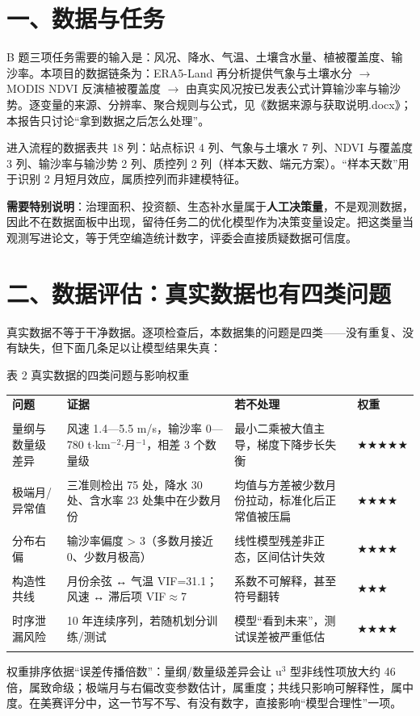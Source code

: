 \documentclass[11pt,a4paper]{ctexart}
\begin{document}
\section*{一、数据与任务}
B 题三项任务需要的输入是：风况、降水、气温、土壤含水量、植被覆盖度、输沙率。本项目的数据链条为：ERA5-Land 再分析提供气象与土壤水分 $\to$ MODIS NDVI 反演植被覆盖度 $\to$ 由真实风况按已发表公式计算输沙率与输沙势。逐变量的来源、分辨率、聚合规则与公式，见《数据来源与获取说明.docx》；本报告只讨论“拿到数据之后怎么处理”。

进入流程的数据表共 18 列：站点标识 4 列、气象与土壤水 7 列、NDVI 与覆盖度 3 列、输沙率与输沙势 2 列、质控列 2 列（样本天数、端元方案）。“样本天数”用于识别 2 月短月效应，属质控列而非建模特征。

\textbf{需要特别说明}：治理面积、投资额、生态补水量属于\textbf{人工决策量}，不是观测数据，因此不在数据面板中出现，留待任务二的优化模型作为决策变量设定。把这类量当观测写进论文，等于凭空编造统计数字，评委会直接质疑数据可信度。


\section*{二、数据评估：真实数据也有四类问题}
真实数据不等于干净数据。逐项检查后，本数据集的问题是四类——没有重复、没有缺失，但下面几条足以让模型结果失真：

表 2  真实数据的四类问题与影响权重


\begin{table}[H]\centering\small\setlength{\parskip}{2pt}
\begin{tabularx}{\textwidth}{|X|X|X|X|}
\toprule
\textbf{问题} & \textbf{证据} & \textbf{若不处理} & \textbf{权重} \\\\
\midrule
量纲与数量级差异 & 风速 1.4—5.5 m/s，输沙率 0—780 t$\cdot$km$^{-2}$$\cdot$月$^{-1}$，相差 3 个数量级 & 最小二乘被大值主导，梯度下降步长失衡 & ★★★★★ \\\\
极端月/异常值 & 三准则检出 75 处，降水 30 处、含水率 23 处集中在少数月份 & 均值与方差被少数月份拉动，标准化后正常值被压扁 & ★★★★ \\\\
分布右偏 & 输沙率偏度 > 3（多数月接近 0、少数月极高） & 线性模型残差非正态，区间估计失效 & ★★★★ \\\\
构造性共线 & 月份余弦 ↔ 气温 VIF=31.1；风速 ↔ 滞后项 VIF$\approx$7 & 系数不可解释，甚至符号翻转 & ★★★ \\\\
时序泄漏风险 & 10 年连续序列，若随机划分训练/测试 & 模型“看到未来”，测试误差被严重低估 & ★★★★ \\\\
\bottomrule
\end{tabularx}
\end{table}
权重排序依据“误差传播倍数”：量纲/数量级差异会让 u$^{3}$ 型非线性项放大约 46 倍，属致命级；极端月与右偏改变参数估计，属重度；共线只影响可解释性，属中度。在美赛评分中，这一节写不写、有没有数字，直接影响“模型合理性”一项。
\end{document}
